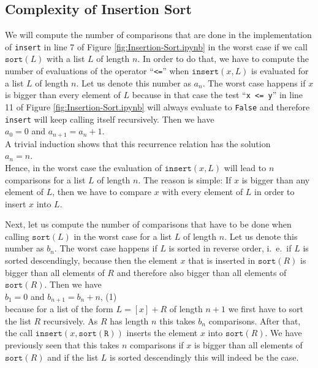 \subsection{Complexity of Insertion Sort}
We will compute the number of comparisons that are done in the implementation of \texttt{insert}
in line 7 of Figure \ref{fig:Insertion-Sort.ipynb} in the worst case if we call $\texttt{sort}(L)$ with a list $L$ of length $n$. In order to do that,
we have to compute the number of evaluations of the operator ``\texttt{<=}'' when 
 $\texttt{insert}(x,L)$ is evaluated for a list $L$ of length $n$.  Let us denote this number as 
$a_n$.  The worst case happens if $x$ is bigger than every element of $L$ because in that case the
test ``\texttt{x <= y}'' in line 11 of Figure \ref{fig:Insertion-Sort.ipynb} will always evaluate to
\texttt{False} and therefore \texttt{insert} will keep calling itself recursively.
Then we have
\\[0.2cm]
\hspace*{1.3cm}
$a_0 = 0$ \quad and \quad $a_{n+1} = a_n + 1$. 
\\[0.2cm]
A trivial induction shows that this recurrence relation has the solution
\\[0.2cm]
\hspace*{1.3cm} 
$a_n = n$.
\\[0.2cm]
Hence, in the worst case the evaluation of $\mathtt{insert}(x,L)$ will lead to $n$ comparisons for a list
$L$ of length $n$.  The reason is simple:  If $x$ is bigger than any element of $L$, then we have to
compare $x$ with every element of $L$ in order to insert $x$ into $L$.

Next, let us compute the number of comparisons that have to be done when calling
$\texttt{sort}(L)$ in the worst case for a list  $L$ of length $n$.  Let us denote this number as
$b_n$. The worst case happens if $L$ is sorted in reverse order, i.~e.~if $L$ is sorted
descendingly, because then the element $x$ that is inserted in $\texttt{sort}(R)$ is bigger than all elements
of $R$ and therefore also bigger than all elements of $\texttt{sort}(R)$.  Then we have \\[0.2cm]
\hspace*{1.3cm}
 $b_1 = 0$ \quad and \quad $b_{n+1} = b_n + n$, \hspace*{\fill} (1)
\\[0.2cm]
because for a list of the form $L = [x] + R$ of length $n+1$ we first have to sort the list $R$
recursively.  As $R$ has length $n$ this takes $b_n$ comparisons.  After that, the call
$\mathtt{insert}(x, \mathtt{sort(R)})$ 
inserts the element $x$ into $\mathtt{sort}(R)$.  We have previously seen that this takes $n$
comparisons if $x$ is bigger than all elements of $\mathtt{sort}(R)$ and if the list $L$ is sorted
descendingly this will indeed be the case.

